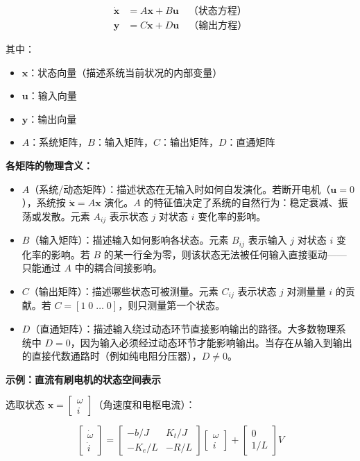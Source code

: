 \begin{align}
\dot{\mathbf{x}} &= A\mathbf{x} + B\mathbf{u} \quad \text{（状态方程）} \\
\mathbf{y} &= C\mathbf{x} + D\mathbf{u} \quad \text{（输出方程）}
\end{align}

其中：
\begin{itemize}[nosep]
    \item $\mathbf{x}$：状态向量（描述系统当前状况的内部变量）
    \item $\mathbf{u}$：输入向量
    \item $\mathbf{y}$：输出向量
    \item $A$：系统矩阵，$B$：输入矩阵，$C$：输出矩阵，$D$：直通矩阵
\end{itemize}

\textbf{各矩阵的物理含义：}
\begin{itemize}
    \item $A$（系统/动态矩阵）：描述状态在无输入时如何自发演化。若断开电机（$\mathbf{u} = 0$），系统按 $\dot{\mathbf{x}} = A\mathbf{x}$ 演化。$A$ 的特征值决定了系统的自然行为：稳定衰减、振荡或发散。元素 $A_{ij}$ 表示状态 $j$ 对状态 $i$ 变化率的影响。
    \item $B$（输入矩阵）：描述输入如何影响各状态。元素 $B_{ij}$ 表示输入 $j$ 对状态 $i$ 变化率的影响。若 $B$ 的某一行全为零，则该状态无法被任何输入直接驱动——只能通过 $A$ 中的耦合间接影响。
    \item $C$（输出矩阵）：描述哪些状态可被测量。元素 $C_{ij}$ 表示状态 $j$ 对测量量 $i$ 的贡献。若 $C = [1\;0\;\ldots\;0]$，则只测量第一个状态。
    \item $D$（直通矩阵）：描述输入绕过动态环节直接影响输出的路径。大多数物理系统中 $D = 0$，因为输入必须经过动态环节才能影响输出。当存在从输入到输出的直接代数通路时（例如纯电阻分压器），$D \neq 0$。
\end{itemize}

\textbf{示例：直流有刷电机的状态空间表示}

选取状态 $\mathbf{x} = \begin{bmatrix} \omega \\ i \end{bmatrix}$（角速度和电枢电流）：

\begin{equation}
\begin{bmatrix} \dot{\omega} \\ \dot{i} \end{bmatrix} =
\begin{bmatrix} -b/J & K_t/J \\ -K_e/L & -R/L \end{bmatrix}
\begin{bmatrix} \omega \\ i \end{bmatrix} +
\begin{bmatrix} 0 \\ 1/L \end{bmatrix} V
\end{equation}

